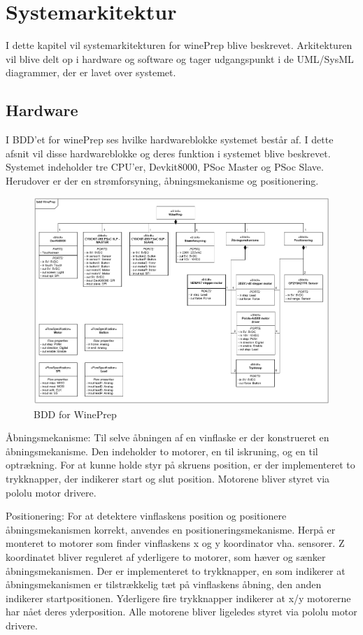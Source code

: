 \chapter{Systemarkitektur}
I dette kapitel vil systemarkitekturen for winePrep blive beskrevet. Arkitekturen vil blive delt op i hardware og software og tager udgangspunkt 
i de UML/SysML diagrammer, der er lavet over systemet. 

\section{Hardware}
I BDD'et for winePrep ses hvilke hardwareblokke systemet består af. I dette afsnit vil disse hardwareblokke og deres funktion i systemet blive beskrevet.
Systemet indeholder tre CPU'er, Devkit8000, PSoc Master og PSoc Slave. Herudover er der en strømforsyning, åbningsmekanisme og positionering.\\

\begin{figure}[H]
\includegraphics[scale=0.33]{tex/Arkitektur/Fotos/HW/BDD_winePrep}
\caption{BDD for WinePrep}
\end{figure}

Åbningsmekanisme:
Til selve åbningen af en vinflaske er der konstrueret en åbningsmekanisme. Den indeholder to motorer, en til iskruning, og en til optrækning.
For at kunne holde styr på skruens position, er der implementeret to trykknapper, der indikerer start og slut position. Motorene bliver styret via 
pololu motor drivere.   

Positionering:
For at detektere vinflaskens position og positionere åbningsmekanismen korrekt, anvendes en positioneringsmekanisme. Herpå er monteret to motorer som finder
vinflaskens x og y koordinator vha. sensorer. Z koordinatet bliver reguleret af yderligere to motorer, som hæver og sænker åbningsmekanismen. 
Der er implementeret to trykknapper, en som indikerer at åbningsmekanismen er tilstrækkelig tæt på vinflaskens åbning, den anden indikerer startpositionen. 
Yderligere fire trykknapper indikerer at x/y motorerne har nået deres yderposition. Alle motorene bliver ligeledes styret via pololu motor drivere.        
      
